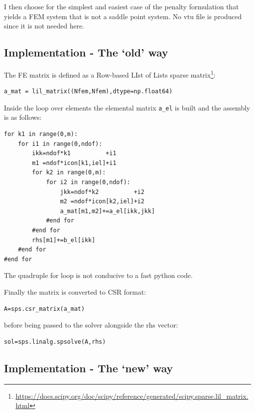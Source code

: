 I then choose for the simplest and easiest case of the penalty formulation that yields a FEM system that 
is not a saddle point system. No vtu file is produced since it is not needed here.

\subsection*{Implementation - The `old' way}

The FE matrix is defined as a Row-based LIst of Lists sparse 
matrix\footnote{\url{https://docs.scipy.org/doc/scipy/reference/generated/scipy.sparse.lil_matrix.html}}:
\begin{lstlisting}
a_mat = lil_matrix((Nfem,Nfem),dtype=np.float64)
\end{lstlisting}
Inside the loop over elements the elemental matrix \lstinline{a_el} is built
and the assembly is as follows:

\begin{lstlisting}
for k1 in range(0,m):
    for i1 in range(0,ndof):
        ikk=ndof*k1          +i1
        m1 =ndof*icon[k1,iel]+i1
        for k2 in range(0,m):
            for i2 in range(0,ndof):
                jkk=ndof*k2          +i2
                m2 =ndof*icon[k2,iel]+i2
                a_mat[m1,m2]+=a_el[ikk,jkk]
            #end for
        #end for
        rhs[m1]+=b_el[ikk]
    #end for
#end for
\end{lstlisting}
The quadruple for loop is not conducive to a fast python code.

Finally the matrix is converted to CSR format:
\begin{lstlisting}
A=sps.csr_matrix(a_mat)
\end{lstlisting}
before being passed to the solver alongside the rhs vector:
\begin{lstlisting}
sol=sps.linalg.spsolve(A,rhs)
\end{lstlisting}

\subsection*{Implementation - The `new' way}

